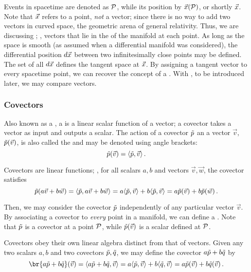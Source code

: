 Events in spacetime are denoted as $\event P$, while its position by $\vec\pos\vat{\event P}$, or shortly $\vec{x}$. Note that $\vec{x}$ refers to a point, \emph{not} a vector; since there is no way to add two vectors in curved space, the geometric arena of general relativity. Thus, we are discussing ; \ie, vectors that lie in the  of the manifold at each point. As long as the space is smooth (as assumed when a differential manifold was considered), the differential position $d\vec{x}$ between two infinitesimally close points may be defined. The set of all $d\vec{x}$ defines the tangent space at $\vec{x}$. By assigning a tangent vector to every spacetime point, we can recover the concept of a . With , to be introduced later, we may compare vectors.


\subsubsection{Covectors}

Also known as a , a  is a linear scalar function of a vector; a covector takes a vector as input and outputs a scalar. The action of a covector $\tilde{p}$ an a vector $\vec v$, $\cov p\vat{\vec v}$, is also called the  and may be denoted using angle brackets:
%
\begin{equation}\label{eq:scalarproductvectorcovector}
  \cov p\vat{\vec v} = \sprod{\cov p}{\vec v}\,.
\end{equation}

Covectors are linear functions; \ie, for all scalars $a,b$ and vectors $\vec v,\vec w$, the covector satisfies
%
\begin{equation}\label{eq:scalarproductidentities}
  \cov p\vat{a\vec v + b\vec w} = \sprod{\cov p}{a\vec v + b\vec w}
                                = a\sprod{\cov p}{\vec v} + b\sprod{\cov p}{\vec v}
                                = a\cov p\vat{\vec v} + b\cov p\vat{\vec w}\,.
\end{equation}

Then, we may consider the covector $\tilde{p}$ independently of any particular vector $\vec v$. By associating a covector to \emph{every} point in a manifold, we can define a . Note that $\tilde{p}$ is a covector at a point $\point P$, while $\cov p\vat{\vec v}$ is a scalar defined at $\point P$.

Covectors obey their own linear algebra distinct from that of vectors. Given any two scalars $a,b$ and two covectors $\tilde{p},\tilde{q}$, we may define the covector $a\tilde{p} + b\tilde{q}$ by
%
\begin{equation}\label{eq:covectorlinearity}
  \br{a\cov p + b\cov q}\vat{\vec v}  = \sprod{a\cov p + b\cov q}{\vec v}
                                      = a\sprod{\cov p}{\vec v} + b\sprod{\cov q}{\vec v}
                                      = a\cov p\vat{\vec v} + b\cov q\vat{\vec v}\,.
\end{equation}

